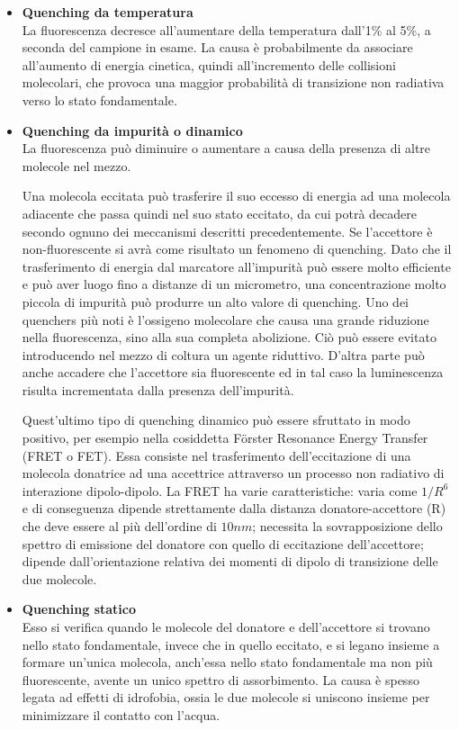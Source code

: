 \begin{itemize}
\item \textbf{Quenching da temperatura}\\
La fluorescenza decresce all'aumentare della temperatura dall'1\% al 5\%, a seconda del campione in esame. 
La causa è probabilmente da associare all'aumento di energia cinetica, quindi all'incremento delle collisioni molecolari, che provoca una maggior probabilità di transizione non radiativa verso lo stato fondamentale.

\item \textbf{Quenching da impurità o dinamico} \\
La fluorescenza può diminuire o aumentare a causa della presenza di altre molecole nel mezzo. 

Una molecola eccitata può trasferire il suo eccesso di energia ad una molecola adiacente che passa quindi nel suo stato eccitato, da cui potrà decadere
secondo ognuno dei meccanismi descritti precedentemente. 
Se l'accettore è non-fluorescente si avrà come risultato un fenomeno di quenching. 
Dato che il trasferimento di energia dal marcatore all'impurità può essere molto efficiente e può aver luogo fino a distanze di un micrometro, una concentrazione molto piccola di impurità può produrre un alto valore di quenching. 
Uno dei quenchers più noti è l'ossigeno molecolare che causa una grande riduzione nella fluorescenza, sino alla sua completa abolizione. 
Ciò può essere evitato introducendo nel mezzo di coltura un agente riduttivo.
D'altra parte può anche accadere che l'accettore sia fluorescente ed in tal caso la luminescenza risulta incrementata dalla presenza dell'impurità.

Quest'ultimo tipo di quenching dinamico può essere sfruttato in modo positivo, per esempio nella cosiddetta F\"{o}rster Resonance Energy Transfer (FRET o FET). 
Essa consiste nel trasferimento dell'eccitazione di una molecola donatrice ad una accettrice attraverso un processo non radiativo di interazione dipolo-dipolo.
La FRET ha varie caratteristiche: varia come $1/R^6$ e di conseguenza dipende strettamente dalla distanza donatore-accettore (R) che deve essere al più dell'ordine di $10 nm$; necessita la sovrapposizione dello spettro di emissione del donatore con quello di eccitazione dell'accettore; dipende dall'orientazione relativa dei momenti di dipolo di transizione delle due molecole.

\item \textbf{Quenching statico} \\
Esso si verifica quando le molecole del donatore e dell'accettore si trovano nello stato fondamentale, invece che in quello eccitato, e si legano insieme a formare un'unica molecola, anch'essa nello stato fondamentale ma non più fluorescente, avente un unico spettro di assorbimento. 
La causa è spesso legata ad effetti di idrofobia, ossia le due molecole si uniscono insieme per minimizzare il contatto con l'acqua.


\end{itemize}
